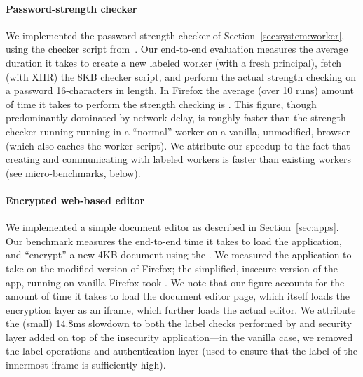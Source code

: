 \paragraph{Password-strength checker}
%
We implemented the password-strength checker of
Section~\ref{sec:system:worker}, using the checker script
from~\cite{checker1}.
%
Our end-to-end evaluation measures the average duration it takes to
create a new labeled worker (with a fresh principal), fetch (with XHR)
the 8KB checker script, and perform the actual strength
checking on a password 16-characters in length.
%
%
In Firefox the average (over 10 runs) amount of time it takes to
perform the strength checking is .
%
This figure, though predominantly dominated by network delay, is
roughly  faster than the strength checker running running in a
``normal'' worker on a vanilla, unmodified, browser (which
also caches the worker script).
%
We attribute our speedup to the fact that creating and communicating
with labeled workers is faster than existing workers (see
micro-benchmarks, below).
%


\paragraph{Encrypted web-based editor}

We implemented a simple document editor as described in
Section~\ref{sec:apps}.
%
Our benchmark measures the end-to-end time it takes to load the
application, and ``encrypt'' a new 4KB document using
the .
%
We measured the \sys{} application to take  on the modified
version of Firefox; the simplified, insecure version of the app,
running on vanilla Firefox took .
%
We note that our figure accounts for the amount of time it takes to
load the document editor page, which itself loads the encryption layer
as an iframe, which further loads the actual editor.
%
We attribute the (small) 14.8ms slowdown to both the label checks
performed by \sys{} and security layer added on top of the insecurity
application---in the vanilla case, we removed the label operations and
authentication layer (used to ensure that the label of the innermost
iframe is sufficiently high).
%


